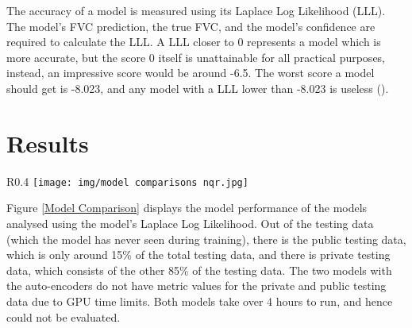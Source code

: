 \documentclass[12pt]{article}
\begin{document}
The accuracy of a model is measured using its Laplace Log Likelihood (LLL).
The model's FVC prediction, the true FVC, and the model's confidence are required to calculate the LLL. 
A LLL closer to 0 represents a model which is more accurate, but the score 0 itself is unattainable for all practical purposes, instead, an impressive score would be around -6.5.
The worst score a model should get is -8.023, and any model with a LLL lower than -8.023 is useless (\cite{laplaceloglikelihood}).

\section{Results}



\begin{wrapfigure}{R}{0.4\textwidth}
    \centering
    \texttt{[image: img/model comparisons nqr.jpg]}
    
    \caption{Comparison of Average Model LLL}
    \label{Model Comparison}
\end{wrapfigure}

Figure \ref{Model Comparison} displays the model performance of the models analysed using the model's Laplace Log Likelihood.
Out of the testing data (which the model has never seen during training), there is the public testing data, which is only around 15\% of the total testing data, and there is private testing data, which consists of the other 85\% of the testing data.
The two models with the auto-encoders do not have metric values for the private and public testing data due to GPU time limits.
Both models take over 4 hours to run, and hence could not be evaluated.
\end{document}
